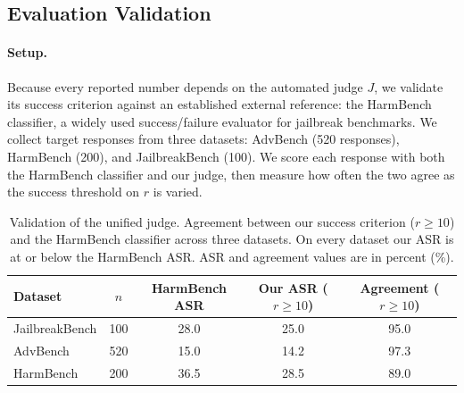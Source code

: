 \subsection{Evaluation Validation}
\label{sec:validation}

\paragraph{Setup.}
Because every reported number depends on the automated judge $J$, we validate its success criterion against an established external reference: the HarmBench classifier, a widely used success/failure evaluator for jailbreak benchmarks.
We collect target responses from three datasets: AdvBench (520 responses), HarmBench (200), and JailbreakBench (100).
We score each response with both the HarmBench classifier and our judge, then measure how often the two agree as the success threshold on $r$ is varied.

\begin{table}[htbp]
      \centering
      \caption{Validation of the unified judge. Agreement between our success
            criterion ($r \ge 10$) and the HarmBench classifier across three datasets.
            On every dataset our ASR is at or below the HarmBench ASR. ASR and agreement values are in percent (\%).}
      \label{tab:judge_validation}
      \footnotesize
      \renewcommand{\arraystretch}{1.3}
      \setlength{\aboverulesep}{0pt}
      \setlength{\belowrulesep}{0pt}
      \begin{tabular}{lcccc}
            \toprule
            \textbf{Dataset} & {\bfseries\boldmath $n$} & \textbf{HarmBench ASR} & {\bfseries\boldmath Our ASR ($r\ge10$)} & {\bfseries\boldmath Agreement ($r\ge10$)} \\
            \midrule
            JailbreakBench   & 100                      & 28.0                   & 25.0                                    & 95.0                                      \\
            AdvBench         & 520                      & 15.0                   & 14.2                                    & 97.3                                      \\
            HarmBench        & 200                      & 36.5                   & 28.5                                    & 89.0                                      \\
            \bottomrule
      \end{tabular}
\end{table}

